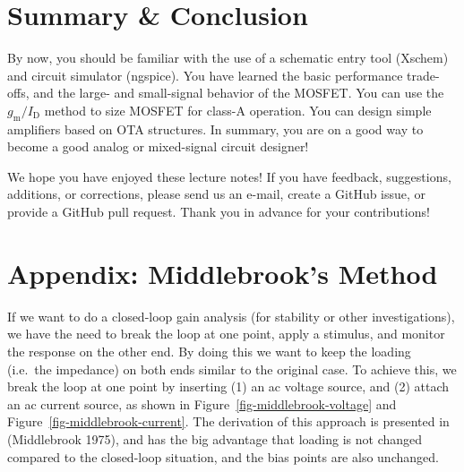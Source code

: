 \documentclass[
  a4paper,
  DIV=11,
  numbers=noendperiod]{scrartcl}
\begin{document}
\section{Summary \& Conclusion}\label{summary-conclusion}

By now, you should be familiar with the use of a schematic entry tool
(Xschem) and circuit simulator (ngspice). You have learned the basic
performance trade-offs, and the large- and small-signal behavior of the
MOSFET. You can use the \(g_\mathrm{m}/I_\mathrm{D}\) method to size
MOSFET for class-A operation. You can design simple amplifiers based on
OTA structures. In summary, you are on a good way to become a good
analog or mixed-signal circuit designer!

\begin{tcolorbox}[enhanced jigsaw, opacityback=0, title=\textcolor{quarto-callout-important-color}{\faExclamation}\hspace{0.5em}{Feedback}, leftrule=.75mm, bottomtitle=1mm, breakable, bottomrule=.15mm, opacitybacktitle=0.6, colbacktitle=quarto-callout-important-color!10!white, colframe=quarto-callout-important-color-frame, toptitle=1mm, titlerule=0mm, colback=white, rightrule=.15mm, coltitle=black, toprule=.15mm, left=2mm, arc=.35mm]

We hope you have enjoyed these lecture notes! If you have feedback,
suggestions, additions, or corrections, please send us an e-mail, create
a GitHub issue, or provide a GitHub pull request. Thank you in advance
for your contributions!

\end{tcolorbox}

\section{Appendix: Middlebrook's Method}\label{sec-middlebrook-method}

If we want to do a closed-loop gain analysis (for stability or other
investigations), we have the need to break the loop at one point, apply
a stimulus, and monitor the response on the other end. By doing this we
want to keep the loading (i.e.~the impedance) on both ends similar to
the original case. To achieve this, we break the loop at one point by
inserting (1) an ac voltage source, and (2) attach an ac current source,
as shown in Figure~\ref{fig-middlebrook-voltage} and
Figure~\ref{fig-middlebrook-current}. The derivation of this approach is
presented in (Middlebrook 1975), and has the big advantage that loading
is not changed compared to the closed-loop situation, and the bias
points are also unchanged.
\end{document}
